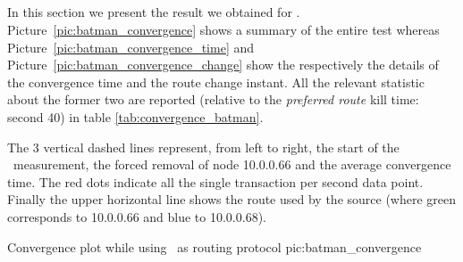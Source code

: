 \subsection{\batman}
In this section we present the result we obtained for
\batman. Picture~\ref{pic:batman_convergence} shows a summary of the
entire test whereas Picture~\ref{pic:batman_convergence_time}
and Picture~\ref{pic:batman_convergence_change} show the respectively the
details of the convergence time and the route change instant. All the relevant
statistic about the former two are reported (relative to the
\emph{preferred route} kill time: second 40) in table \ref{tab:convergence_batman}.

The 3 vertical dashed lines represent, from left to right, the start of
the \netperf\ measurement, the forced removal of node 10.0.0.66 and the
average convergence time. The red dots indicate all the single
transaction per second data point. Finally the upper horizontal line
shows
the route used by the source (where green corresponds to 10.0.0.66 and
blue to 10.0.0.68).

            {\textwidth}
            {Convergence plot while using \batman\ as routing protocol}
            {pic:batman_convergence}


